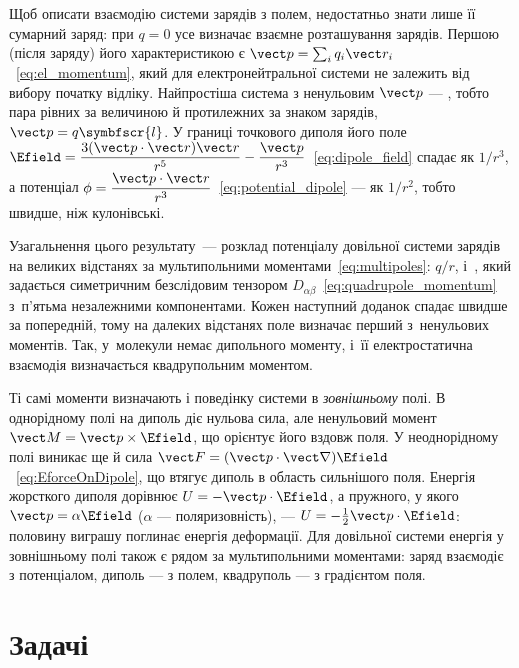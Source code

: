 Щоб описати взаємодію системи зарядів з полем, недостатньо знати лише її сумарний заряд: при $q=0$ усе визначає взаємне розташування зарядів. Першою (після заряду) його характеристикою є  $\vect p=\sum_i q_i\vect r_i$~\eqref{eq:el_momentum}, який для електронейтральної системи не залежить від вибору початку відліку. Найпростіша система з ненульовим $\vect p$ --- , тобто пара рівних за величиною й протилежних за знаком зарядів, $\vect p=q\symbfscr{l}$. У границі точкового диполя його поле $\Efield=\dfrac{3(\vect p\cdot\vect r)\vect r}{r^5}-\dfrac{\vect p}{r^3}$~\eqref{eq:dipole_field} спадає як $1/r^3$, а потенціал $\phi=\dfrac{\vect p\cdot\vect r}{r^3}$~\eqref{eq:potential_dipole} --- як $1/r^2$, тобто швидше, ніж кулонівські.

Узагальнення цього результату~--- розклад потенціалу довільної системи зарядів на великих відстанях за мультипольними моментами~\eqref{eq:multipoles}:  $q/r$,  і~, який задається симетричним безслідовим тензором $D_{\alpha\beta}$~\eqref{eq:quadrupole_momentum} з~п'ятьма незалежними компонентами. Кожен наступний доданок спадає швидше за попередній, тому на далеких відстанях поле визначає перший з~ненульових моментів. Так, у~молекули  немає дипольного моменту, і~її електростатична взаємодія визначається квадрупольним моментом.

Ті самі моменти визначають і поведінку системи в \emph{зовнішньому} полі. В однорідному полі на диполь діє нульова сила, але ненульовий момент $\vect M=\vect p\times\Efield$, що орієнтує його вздовж поля. У неоднорідному полі виникає ще й сила $\vect F=(\vect p\cdot\vect\nabla)\Efield$~\eqref{eq:EforceOnDipole}, що втягує диполь в область сильнішого поля. Енергія жорсткого диполя дорівнює $U=-\vect p\cdot\Efield$, а пружного, у якого $\vect p=\alpha\Efield$ ($\alpha$ --- поляризовність), --- $U=-\frac12\vect p\cdot\Efield$: половину виграшу поглинає енергія деформації. Для довільної системи енергія у зовнішньому полі також є рядом за мультипольними моментами: заряд взаємодіє з потенціалом, диполь --- з полем, квадруполь --- з градієнтом поля.

\section*{Задачі}
{}

